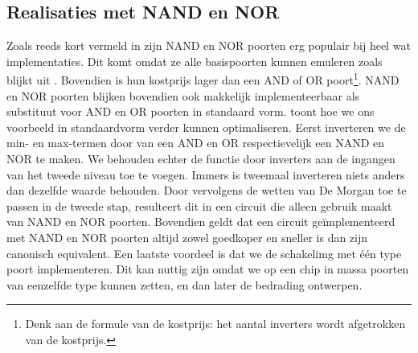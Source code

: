 \subsection{Realisaties met NAND en NOR}
Zoals reeds kort vermeld in  zijn NAND en NOR poorten erg populair bij heel wat implementaties. Dit komt omdat ze alle basispoorten kunnen emuleren zoals blijkt uit . Bovendien is hun kostprijs lager dan een AND of OR poort\footnote{Denk aan de formule van de kostprijs: het aantal inverters wordt afgetrokken van de kostprijs.}. NAND en NOR poorten blijken bovendien ook makkelijk implementeerbaar als substituut voor AND en OR poorten in standaard vorm.  toont hoe we ons voorbeeld in standaardvorm verder kunnen optimaliseren. Eerst inverteren we de min- en max-termen door van een AND en OR respectievelijk een NAND en NOR te maken. We behouden echter de functie door inverters aan de ingangen van het tweede niveau toe te voegen. Immers is tweemaal inverteren niets anders dan dezelfde waarde behouden. Door vervolgens de wetten van De Morgan toe te passen in de tweede stap, resulteert dit in een circuit die alleen gebruik maakt van NAND en NOR poorten. Bovendien geldt dat een circuit ge\"implementeerd met NAND en NOR poorten altijd zowel goedkoper en sneller is dan zijn canonisch equivalent. Een laatste voordeel is dat we de schakelimg met \'e\'en type poort implementeren. Dit kan nuttig zijn omdat we op een chip in massa poorten van eenzelfde type kunnen zetten, en dan later de bedrading ontwerpen.

